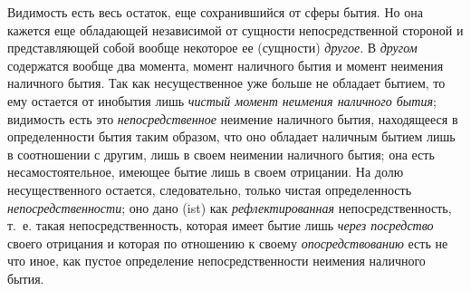 Видимость есть весь остаток, еще сохранившийся от сферы бытия. Но она
кажется еще обладающей независимой от сущности непосредственной стороной и
представляющей собой вообще некоторое ее (сущности)
{\em другое}. В {\em другом}
содержатся вообще два момента, момент наличного бытия и момент неимения
наличного бытия. Так как несущественное уже больше не обладает бытием, то
ему остается от инобытия лишь {\em чистый момент
неимения наличного бытия}; видимость есть это
{\em непосредственное} неимение наличного бытия,
находящееся в определенности бытия таким образом, что оно обладает наличным
бытием лишь в соотношении с другим, лишь в своем неимении наличного бытия;
она есть несамостоятельное, имеющее бытие лишь в своем отрицании. На долю
несущественного остается, следовательно, только чистая определенность
{\em непосредственности}; оно дано (ist) как
{\em рефлектированная} непосредственность, т.~е. такая
непосредственность, которая имеет бытие лишь {\em через
посредство} своего отрицания и которая по отношению к своему
{\em опосредствованию} есть не что иное, как пустое
определение непосредственности неимения наличного бытия.

